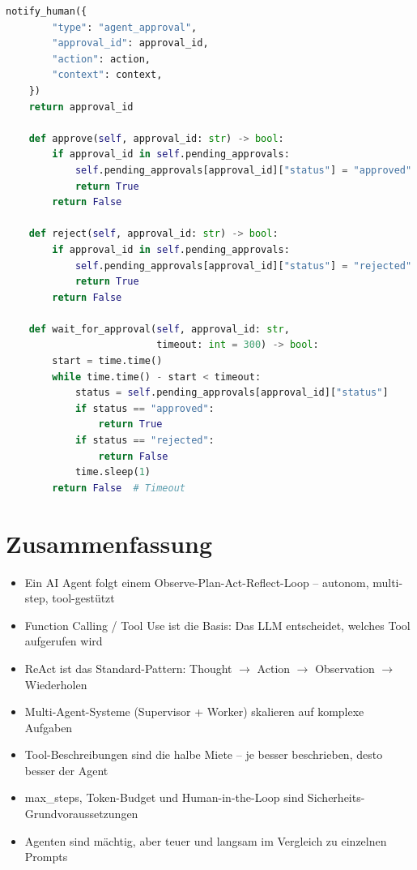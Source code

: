 \begin{lstlisting}[language=Python]
    notify_human({
        "type": "agent_approval",
        "approval_id": approval_id,
        "action": action,
        "context": context,
    })
    return approval_id

    def approve(self, approval_id: str) -> bool:
        if approval_id in self.pending_approvals:
            self.pending_approvals[approval_id]["status"] = "approved"
            return True
        return False

    def reject(self, approval_id: str) -> bool:
        if approval_id in self.pending_approvals:
            self.pending_approvals[approval_id]["status"] = "rejected"
            return True
        return False

    def wait_for_approval(self, approval_id: str,
                          timeout: int = 300) -> bool:
        start = time.time()
        while time.time() - start < timeout:
            status = self.pending_approvals[approval_id]["status"]
            if status == "approved":
                return True
            if status == "rejected":
                return False
            time.sleep(1)
        return False  # Timeout
\end{lstlisting}

\section{Zusammenfassung}

\begin{itemize}[leftmargin=*]
    \item Ein AI Agent folgt einem Observe-Plan-Act-Reflect-Loop -- autonom, multi-step, tool-gestützt
    \item Function Calling / Tool Use ist die Basis: Das LLM entscheidet, welches Tool aufgerufen wird
    \item ReAct ist das Standard-Pattern: Thought $\rightarrow$ Action $\rightarrow$ Observation $\rightarrow$ Wiederholen
    \item Multi-Agent-Systeme (Supervisor + Worker) skalieren auf komplexe Aufgaben
    \item Tool-Beschreibungen sind die halbe Miete -- je besser beschrieben, desto besser der Agent
    \item max\_steps, Token-Budget und Human-in-the-Loop sind Sicherheits-Grundvoraussetzungen
    \item Agenten sind mächtig, aber teuer und langsam im Vergleich zu einzelnen Prompts
\end{itemize}

